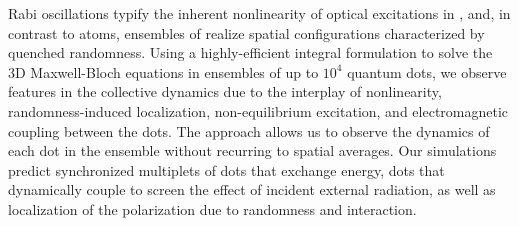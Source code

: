 Rabi oscillations typify the inherent nonlinearity of optical excitations in \qds{}, and, in contrast to atoms, ensembles of \qds{} realize spatial configurations characterized by quenched randomness. Using a highly-efficient integral formulation to solve the 3D Maxwell-Bloch equations in ensembles of up to $10^4$ quantum dots, we observe features in the collective dynamics due to the interplay of nonlinearity, randomness-induced localization, non-equilibrium excitation, and electromagnetic coupling between the dots. The approach allows us to observe the dynamics of each dot in the ensemble without recurring to spatial averages. Our simulations predict synchronized multiplets of dots that exchange energy, dots that dynamically couple to screen the effect of incident external radiation, as well as localization of the polarization due to randomness and interaction.
